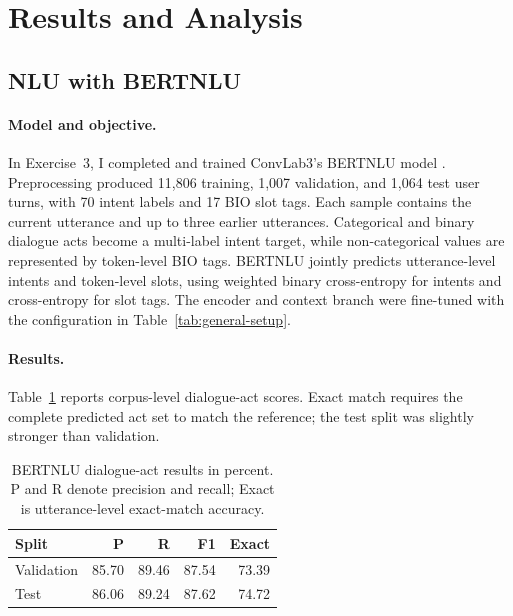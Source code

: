 \documentclass[11pt]{article}
\begin{document}
\newpage
\section{Results and Analysis}\label{sec:results}

\subsection{NLU with BERTNLU}\label{sec:nlu}
\paragraph{Model and objective.}
In Exercise~3, I completed and trained ConvLab3's BERTNLU model
\citep{devlin-etal-2019-bert,zhu-etal-2023-convlab}. Preprocessing produced
11,806 training, 1,007 validation, and 1,064 test user turns, with 70 intent
labels and 17 BIO slot tags. Each sample contains the current utterance and up
to three earlier utterances. Categorical and binary dialogue acts become a
multi-label intent target, while non-categorical values are represented by
token-level BIO tags. BERTNLU jointly predicts utterance-level intents and
token-level slots, using weighted binary cross-entropy for intents and
cross-entropy for slot tags. The encoder and context branch were fine-tuned
with the configuration in Table~\ref{tab:general-setup}.

\paragraph{Results.}
Table~\ref{tab:bertnlu-results} reports corpus-level dialogue-act scores.
Exact match requires the complete predicted act set to match the reference;
the test split was slightly stronger than validation.

\begin{table}[H]
  \centering
  \small
  \begin{tabular*}{\columnwidth}{@{\extracolsep{\fill}}lrrrr@{}}
    \toprule
    \textbf{Split} & \textbf{P} & \textbf{R} & \textbf{F1} & \textbf{Exact} \\
    \midrule
    Validation & 85.70 & 89.46 & 87.54 & 73.39 \\
    Test       & 86.06 & 89.24 & 87.62 & 74.72 \\
    \bottomrule
  \end{tabular*}
  \caption{BERTNLU dialogue-act results in percent. P and R denote precision
  and recall; Exact is utterance-level exact-match accuracy.}
  \label{tab:bertnlu-results}
\end{table}
\end{document}
